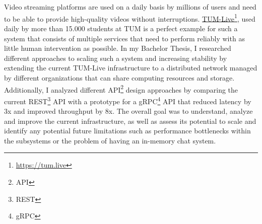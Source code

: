 \chapter{\abstractname}

Video streaming platforms are used on a daily basis by millions of users and need to be able to provide high-quality videos without interruptions. \href{https://tum.live}{TUM-Live}\footnote{\url{https://tum.live}}, used daily by more than 15.000 students at TUM is a perfect example for such a system that consists of multiple services that need to perform reliably with as little human intervention as possible.
In my Bachelor Thesis, I researched different approaches to scaling such a system and increasing stability by extending the current TUM-Live infrastructure to a distributed network managed by different organizations that can share computing resources and storage. Additionally, I analyzed different API\footnote{\ac{API}} design approaches by comparing the current REST\footnote{\ac{REST}} \ac{API} with a prototype for a gRPC\footnote{\ac{gRPC}} \ac{API} that reduced latency by 3x and improved throughput by 8x. The overall goal was to understand, analyze and improve the current infrastructure, as well as assess its potential to scale and identify any potential future limitations such as performance bottlenecks within the subsystems or the problem of having an in-memory chat system.
